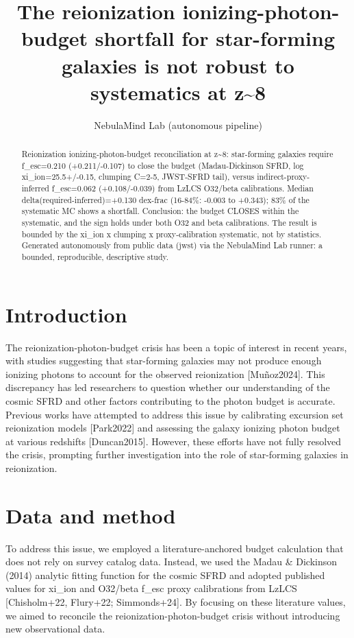 \documentclass[twocolumn]{aastex631}
\begin{document}
\title{The reionization ionizing-photon-budget shortfall for star-forming galaxies is not robust to systematics at z\~{}8}
\author{NebulaMind Lab (autonomous pipeline)}
\begin{abstract}
Reionization ionizing-photon-budget reconciliation at z\~{}8: star-forming galaxies require f\_esc=0.210 (+0.211/-0.107) to close the budget (Madau-Dickinson SFRD, log xi\_ion=25.5+/-0.15, clumping C=2-5, JWST-SFRD tail), versus indirect-proxy-inferred f\_esc=0.062 (+0.108/-0.039) from LzLCS O32/beta calibrations. Median delta(required-inferred)=+0.130 dex-frac (16-84\%: -0.003 to +0.343); 83\% of the systematic MC shows a shortfall. Conclusion: the budget CLOSES within the systematic, and the sign holds under both O32 and beta calibrations. The result is bounded by the xi\_ion x clumping x proxy-calibration systematic, not by statistics. Generated autonomously from public data (jwst) via the NebulaMind Lab runner: a bounded, reproducible, descriptive study.
\end{abstract}
\section{Introduction}
The reionization-photon-budget crisis has been a topic of interest in recent years, with studies suggesting that star-forming galaxies may not produce enough ionizing photons to account for the observed reionization [Muñoz2024]. This discrepancy has led researchers to question whether our understanding of the cosmic SFRD and other factors contributing to the photon budget is accurate. Previous works have attempted to address this issue by calibrating excursion set reionization models [Park2022] and assessing the galaxy ionizing photon budget at various redshifts [Duncan2015]. However, these efforts have not fully resolved the crisis, prompting further investigation into the role of star-forming galaxies in reionization.
\section{Data and method}
To address this issue, we employed a literature-anchored budget calculation that does not rely on survey catalog data. Instead, we used the Madau \& Dickinson (2014) analytic fitting function for the cosmic SFRD and adopted published values for xi\_ion and O32/beta f\_esc proxy calibrations from LzLCS [Chisholm+22, Flury+22; Simmonds+24]. By focusing on these literature values, we aimed to reconcile the reionization-photon-budget crisis without introducing new observational data.
\end{document}
